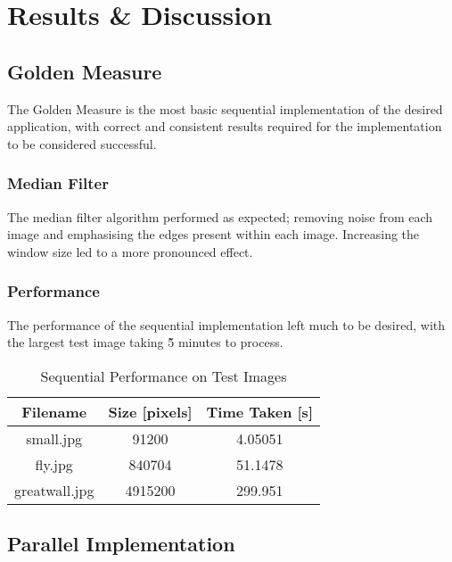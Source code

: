 \section{Results \& Discussion}

\subsection{Golden Measure}

The Golden Measure is the most basic sequential implementation of the desired application, with correct and consistent results required for the implementation to be considered successful.

\subsubsection{Median Filter}
The median filter algorithm performed as expected; removing noise from each image and emphasising the edges present within each image. Increasing the window size led to a more pronounced effect.


\subsubsection{Performance}
The performance of the sequential implementation left much to be desired, with the largest test image taking \~5 minutes to process.

\begin{table}[h]
\centering
\begin{tabular}{|c|c|c|}
\hline
\textbf{Filename} & \textbf{Size [pixels]} & \textbf{Time Taken [s]} \\
\hline

small.jpg     &  91200   &  4.05051 \\ \hline
fly.jpg       &  840704  &  51.1478 \\ \hline
greatwall.jpg &  4915200 &  299.951 \\ \hline

\end{tabular}
\caption{Sequential Performance on Test Images}
\label{tab:comparison}
\end{table}


\subsection{Parallel Implementation}

